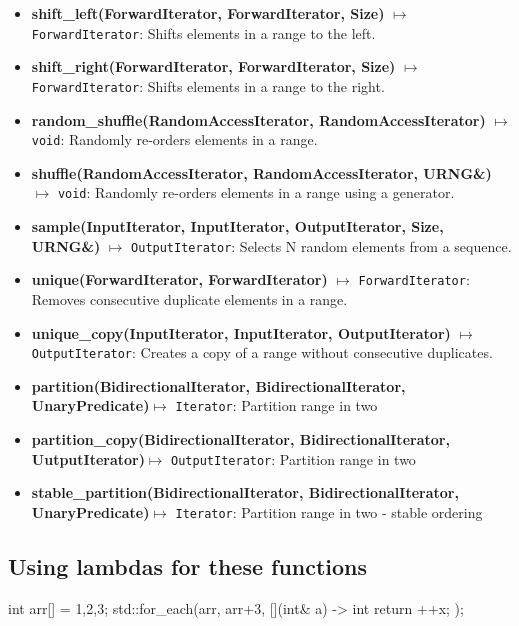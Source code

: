 \documentclass{report}
\begin{document}
\begin{itemize}
        \item \textbf{shift\_left(ForwardIterator, ForwardIterator, Size)} \(\mapsto\) \texttt{ForwardIterator}: Shifts elements in a range to the left.
        \item \textbf{shift\_right(ForwardIterator, ForwardIterator, Size)} \(\mapsto\) \texttt{ForwardIterator}: Shifts elements in a range to the right.
        \item \textbf{random\_shuffle(RandomAccessIterator, RandomAccessIterator)} \(\mapsto\) \texttt{void}: Randomly re-orders elements in a range.
        \item \textbf{shuffle(RandomAccessIterator, RandomAccessIterator, URNG\&)} \(\mapsto\) \texttt{void}: Randomly re-orders elements in a range using a generator.
        \item \textbf{sample(InputIterator, InputIterator, OutputIterator, Size, URNG\&)} \(\mapsto\) \texttt{OutputIterator}: Selects N random elements from a sequence.
        \item \textbf{unique(ForwardIterator, ForwardIterator)} \(\mapsto\) \texttt{ForwardIterator}: Removes consecutive duplicate elements in a range.
        \item \textbf{unique\_copy(InputIterator, InputIterator, OutputIterator)} \(\mapsto\) \texttt{OutputIterator}: Creates a copy of a range without consecutive duplicates.
        \item \textbf{partition(BidirectionalIterator, BidirectionalIterator, UnaryPredicate)}$\mapsto$ \texttt{Iterator}: Partition range in two
        \item \textbf{partition\_copy(BidirectionalIterator, BidirectionalIterator, UutputIterator)}$\mapsto $ \texttt{OutputIterator}: Partition range in two
        \item \textbf{stable\_partition(BidirectionalIterator, BidirectionalIterator, UnaryPredicate)}$\mapsto $ \texttt{Iterator}: Partition range in two - stable ordering 
    \end{itemize}
    
    \bigbreak \noindent 
    \subsection{Using lambdas for these functions}
    \bigbreak \noindent 
    \begin{cppcode}
        int arr[]  = {1,2,3};
        std::for_each(arr, arr+3, [](int& a) -> int { return ++x; });
    \end{cppcode}
\end{document}
